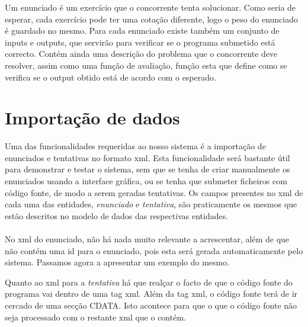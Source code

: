 Um enunciado é um exercício que o concorrente tenta solucionar. Como seria de esperar, cada exercício pode ter uma cotação diferente, 
logo o peso do enunciado é guardado no mesmo. 
Para cada enunciado existe também um conjunto de inputs e outputs, que servirão para verificar se o programa submetido está correcto. 
Contém ainda uma descrição do problema que o concorrente deve resolver, assim como uma função de avaliação, função esta que define como se verifica se o output obtido está de acordo com o esperado.\\

\section{Importação de dados}\label{sec xml}

Uma das funcionalidades requeridas ao nosso sistema é a importação de enunciados e tentativas no formato xml.
Esta funcionalidade será bastante útil para demonstrar e testar o sistema, sem que se tenha de criar manualmente os enunciados
 usando a interface gráfica, ou se tenha que submeter ficheiros com código fonte, de modo a serem geradas tentativas.
Os campos presentes no xml de cada uma das entidades, \textit{enunciado} e \textit{tentativa}, são praticamente os mesmos 
que estão descritos no modelo de dados das respectivas entidades.\\
\\
No xml do enunciado, não há nada muito relevante a acrescentar, além de que não contém uma id para o enunciado, pois esta será gerada 
automaticamente pelo sistema. Passamos agora a apresentar um exemplo do mesmo.

%


Quanto ao xml para a \textit{tentativa} há que realçar o facto de que o código fonte do programa vai dentro de uma tag xml.  Além da tag xml, o código fonte
terá de ir cercado de uma secção CDATA. Isto acontece para que o que o código fonte não seja processado com o restante xml que o contém.\\
\\

%

